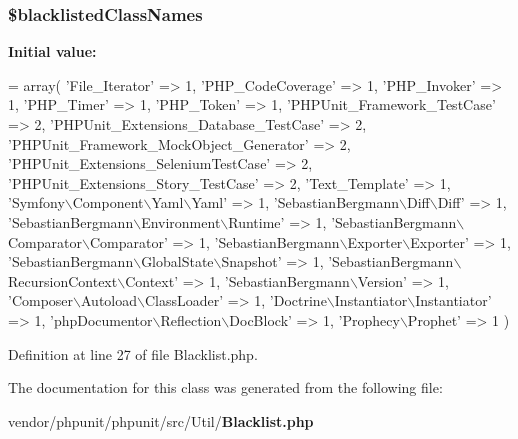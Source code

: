 \subsubsection[{\$blacklisted\+Class\+Names}]{\setlength{\rightskip}{0pt plus 5cm}\$blacklisted\+Class\+Names\hspace{0.3cm}{\ttfamily [static]}}\label{class_p_h_p_unit___util___blacklist_aaaff72b9bed45854bfed8c3c70b31916}
{\bfseries Initial value\+:}
\begin{DoxyCode}
= array(
        \textcolor{stringliteral}{'File\_Iterator'} => 1,
        \textcolor{stringliteral}{'PHP\_CodeCoverage'} => 1,
        \textcolor{stringliteral}{'PHP\_Invoker'} => 1,
        \textcolor{stringliteral}{'PHP\_Timer'} => 1,
        \textcolor{stringliteral}{'PHP\_Token'} => 1,
        \textcolor{stringliteral}{'PHPUnit\_Framework\_TestCase'} => 2,
        \textcolor{stringliteral}{'PHPUnit\_Extensions\_Database\_TestCase'} => 2,
        \textcolor{stringliteral}{'PHPUnit\_Framework\_MockObject\_Generator'} => 2,
        \textcolor{stringliteral}{'PHPUnit\_Extensions\_SeleniumTestCase'} => 2,
        \textcolor{stringliteral}{'PHPUnit\_Extensions\_Story\_TestCase'} => 2,
        \textcolor{stringliteral}{'Text\_Template'} => 1,
        \textcolor{stringliteral}{'Symfony\(\backslash\)Component\(\backslash\)Yaml\(\backslash\)Yaml'} => 1,
        \textcolor{stringliteral}{'SebastianBergmann\(\backslash\)Diff\(\backslash\)Diff'} => 1,
        \textcolor{stringliteral}{'SebastianBergmann\(\backslash\)Environment\(\backslash\)Runtime'} => 1,
        \textcolor{stringliteral}{'SebastianBergmann\(\backslash\)Comparator\(\backslash\)Comparator'} => 1,
        \textcolor{stringliteral}{'SebastianBergmann\(\backslash\)Exporter\(\backslash\)Exporter'} => 1,
        \textcolor{stringliteral}{'SebastianBergmann\(\backslash\)GlobalState\(\backslash\)Snapshot'} => 1,
        \textcolor{stringliteral}{'SebastianBergmann\(\backslash\)RecursionContext\(\backslash\)Context'} => 1,
        \textcolor{stringliteral}{'SebastianBergmann\(\backslash\)Version'} => 1,
        \textcolor{stringliteral}{'Composer\(\backslash\)Autoload\(\backslash\)ClassLoader'} => 1,
        \textcolor{stringliteral}{'Doctrine\(\backslash\)Instantiator\(\backslash\)Instantiator'} => 1,
        \textcolor{stringliteral}{'phpDocumentor\(\backslash\)Reflection\(\backslash\)DocBlock'} => 1,
        \textcolor{stringliteral}{'Prophecy\(\backslash\)Prophet'} => 1
    )
\end{DoxyCode}


Definition at line 27 of file Blacklist.\+php.



The documentation for this class was generated from the following file\+:\begin{DoxyCompactItemize}
\item 
vendor/phpunit/phpunit/src/\+Util/{\bf Blacklist.\+php}\end{DoxyCompactItemize}
